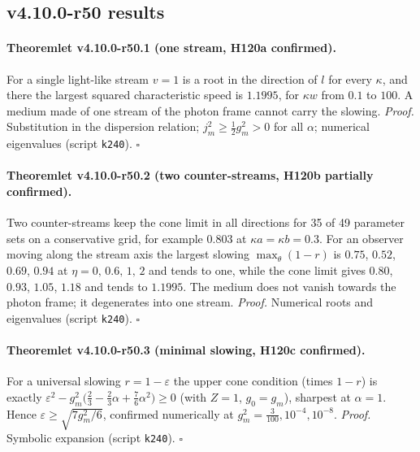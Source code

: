 \subsection*{v4.10.0-r50 results}
\label{subsec:v4100-r50-results}

\paragraph{Theoremlet v4.10.0-r50.1 (one stream, H120a confirmed).}
For a single light-like stream \(v=1\) is a root in the direction of \(l\) for every \(\kappa\), and there the largest squared characteristic speed is \(1.1995\), for \(\kappa w\) from
\(0.1\) to \(100\).  A medium made of one stream of the photon frame cannot carry the slowing.
\emph{Proof.} Substitution in the dispersion relation; \(j_m^2\ge\tfrac12g_m^2>0\) for all \(\alpha\); numerical eigenvalues (script \texttt{k240}).  \(\square\)

\paragraph{Theoremlet v4.10.0-r50.2 (two counter-streams, H120b partially confirmed).}
Two counter-streams keep the cone limit in all directions for 35 of 49 parameter sets on a conservative grid, for example \(0.803\) at \(\kappa a=\kappa b=0.3\).  For
an observer moving along the stream axis the largest slowing \(\max_\theta(1-r)\) is \(0.75\), \(0.52\), \(0.69\), \(0.94\) at \(\eta=0,\,0.6,\,1,\,2\) and tends to one, while the
cone limit gives \(0.80\), \(0.93\), \(1.05\), \(1.18\) and tends to \(1.1995\).  The medium does not vanish towards the photon frame; it degenerates into one stream.
\emph{Proof.} Numerical roots and eigenvalues (script \texttt{k240}).  \(\square\)

\paragraph{Theoremlet v4.10.0-r50.3 (minimal slowing, H120c confirmed).}
For a universal slowing \(r=1-\varepsilon\) the upper cone condition (times \(1-r\)) is exactly \(\varepsilon^2-g_m^2\bigl(\tfrac23-\tfrac23\alpha+\tfrac76\alpha^2\bigr)\ge0\) (with \(Z=1\), \(g_0=g_m\)), sharpest at
\(\alpha=1\).  Hence \(\varepsilon\ge\sqrt{7g_m^2/6}\), confirmed numerically at \(g_m^2=\tfrac3{100},10^{-4},10^{-8}\).
\emph{Proof.} Symbolic expansion (script \texttt{k240}).  \(\square\)

